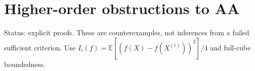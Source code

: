 \section{Higher-order obstructions to
AA}\label{proof:higher_order_obstructions}

Status: explicit proofs. These are counterexamples, not inferences from
a failed sufficient criterion. Use
\(I_{i}(f) = \mathbb E[(f(X)-f(X^{(i)}))^{2}]/4\) and full-cube boundedness.






